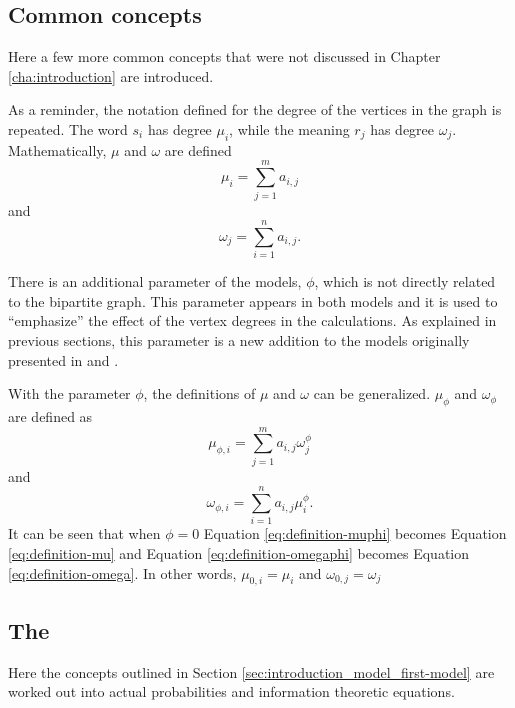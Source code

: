 \subsection{Common concepts}
\label{sec:model_math_graph}

Here a few more common concepts that were not discussed in Chapter \ref{cha:introduction} are introduced.

As a reminder, the notation defined for the degree of the vertices in the graph is repeated.
The word $s_i$ has degree $\mu_i$, while the meaning $r_j$ has degree $\omega_j$.
Mathematically, $\mu$ and $\omega$ are defined
\begin{equation}
  \label{eq:definition-mu}
  \mu_i = \sum_{j=1}^m a_{i,j}
\end{equation}
and
\begin{equation}
  \label{eq:definition-omega}
  \omega_j = \sum_{i=1}^n a_{i,j}.
\end{equation}

There is an additional parameter of the models, $\phi$, which is not directly related to the bipartite graph.
This parameter appears in both models and it is used to ``emphasize'' the effect of the vertex degrees in the calculations.
As explained in previous sections, this parameter is a new addition to the models originally presented in \cite{Ferrer2005a} and \cite{Ferrer2003a}.

With the parameter $\phi$, the definitions of $\mu$ and $\omega$ can be generalized.
$\mu_\phi$ and $\omega_\phi$ are defined as
\begin{equation}
  \label{eq:definition-muphi}
  \mu_{\phi,i} = \sum_{j=1}^m a_{i,j} \omega_j^\phi
\end{equation}
and
\begin{equation}
  \label{eq:definition-omegaphi}
  \omega_{\phi,i} = \sum_{i=1}^n a_{i,j} \mu_i^\phi.
\end{equation}
It can be seen that when $\phi=0$ Equation \eqref{eq:definition-muphi} becomes Equation \eqref{eq:definition-mu} and Equation \eqref{eq:definition-omegaphi} becomes Equation \eqref{eq:definition-omega}.
In other words, $\mu_{0,i} = \mu_i$ and $\omega_{0,j} = \omega_j$

\subsection{The \firstmodel{}}
\label{sec:model_math_first-model}

Here the concepts outlined in Section \ref{sec:introduction_model_first-model} are worked out into actual probabilities and information theoretic equations.

